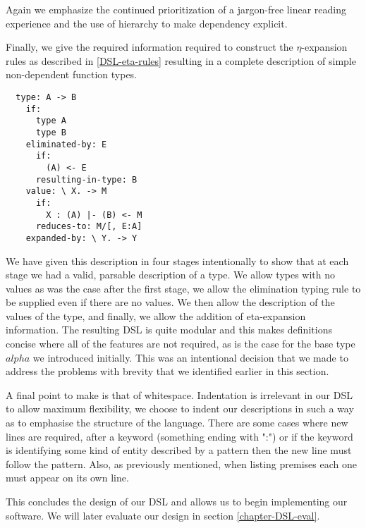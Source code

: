 Again we emphasize the continued prioritization of a jargon-free linear
reading experience and the use of hierarchy to make dependency explicit.

Finally, we give the required information required to construct the
$\eta$-expansion rules as described in \ref{DSL-eta-rules} resulting in
a complete description of simple non-dependent function types.

\begin{BVerbatim}
  type: A -> B
    if:
      type A
      type B
    eliminated-by: E
      if:
        (A) <- E
      resulting-in-type: B
    value: \ X. -> M
      if:
        X : (A) |- (B) <- M
      reduces-to: M/[, E:A]
    expanded-by: \ Y. -> Y
\end{BVerbatim}

We have given this description in four stages intentionally to show
that at each stage we had a valid, parsable description of a type. We
allow types with no values as was the case after the first stage, we
allow the elimination typing rule to be supplied even if there are no
values. We then allow the description of the values of the type, and
finally, we allow the addition of eta-expansion information. The
resulting DSL is quite modular and this makes definitions
concise where all of the features are not required, as is the case for
the base type $alpha$ we introduced initially. This was an intentional
decision that we made to address the problems with brevity that we
identified earlier in this section.

A final point to make is that of whitespace. Indentation is irrelevant
in our DSL to allow maximum flexibility, we choose to indent
our descriptions in such a way as to emphasise the structure of the
language. There are some cases where new lines are required, after a
keyword (something ending with ":") or if the keyword is identifying
some kind of entity described by a pattern then the new line must
follow the pattern. Also, as previously mentioned, when listing
premises each one must appear on its own line.

This concludes the design of our DSL and allows us to begin
implementing our software. We will later evaluate our design in
section \ref{chapter-DSL-eval}.
